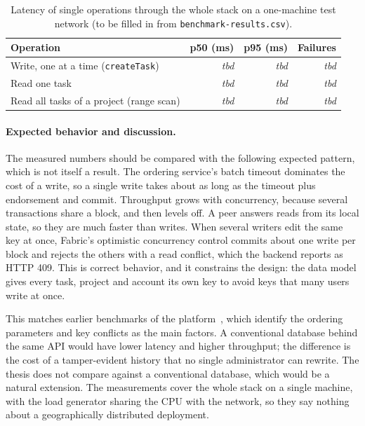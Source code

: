\begin{table}[tb]
    \centering
    \small
    \begin{tabular}{lrrr}
        \toprule
        Operation & p50 (ms) & p95 (ms) & Failures \\
        \midrule
        Write, one at a time (\texttt{createTask}) & \textit{tbd} & \textit{tbd} & \textit{tbd} \\
        Read one task & \textit{tbd} & \textit{tbd} & \textit{tbd} \\
        Read all tasks of a project (range scan) & \textit{tbd} & \textit{tbd} & \textit{tbd} \\
        \bottomrule
    \end{tabular}
    \caption{Latency of single operations through the whole stack on a one-machine test network (to be filled in from \texttt{benchmark-results.csv}).}
    \label{tab:benchmark}
\end{table}


\paragraph{Expected behavior and discussion.} The measured numbers should be compared with the following expected pattern, which is not itself a result. The ordering service's batch timeout dominates the cost of a write, so a single write takes about as long as the timeout plus endorsement and commit. Throughput grows with concurrency, because several transactions share a block, and then levels off. A peer answers reads from its local state, so they are much faster than writes. When several writers edit the same key at once, Fabric's optimistic concurrency control commits about one write per block and rejects the others with a read conflict, which the backend reports as HTTP 409. This is correct behavior, and it constrains the design: the data model gives every task, project and account its own key to avoid keys that many users write at once.

This matches earlier benchmarks of the platform~\cite{thakkar2018performance}, which identify the ordering parameters and key conflicts as the main factors. A conventional database behind the same API would have lower latency and higher throughput; the difference is the cost of a tamper-evident history that no single administrator can rewrite. The thesis does not compare against a conventional database, which would be a natural extension. The measurements cover the whole stack on a single machine, with the load generator sharing the CPU with the network, so they say nothing about a geographically distributed deployment.

